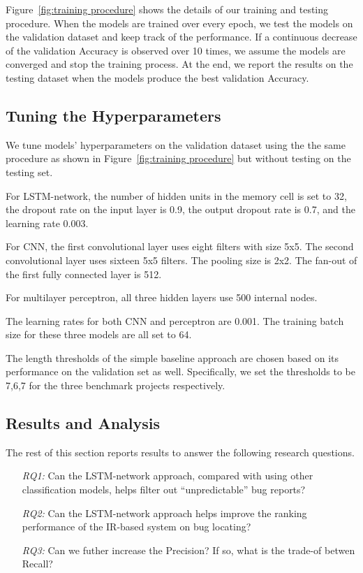 Figure~\ref{fig:training procedure} shows the details of our training and testing procedure. When the models are trained over every epoch, we test the models on the validation dataset and keep track of the performance. If a continuous decrease of the validation Accuracy is observed over 10 times, we assume the models are converged and stop the training process. At the end, we report the results on the testing dataset when the models produce the best validation Accuracy.

\subsection{Tuning the Hyperparameters}
\label{sec:tuning parameters}
We tune models' hyperparameters on the validation dataset using the the same procedure as shown in Figure~\ref{fig:training procedure} but without testing on the testing set.

For LSTM-network, the number of hidden units in the memory cell is set to 32, the dropout rate on the input layer is 0.9, the output dropout rate is 0.7, and the learning rate 0.003.

For CNN, the first convolutional layer uses eight filters with size 5x5. The second convolutional layer uses sixteen 5x5 filters. The pooling size is 2x2. The fan-out of the first fully connected layer is 512.

For multilayer perceptron, all three hidden layers use 500 internal nodes.

The learning rates for both CNN and perceptron are 0.001. The training batch size for these three models are all set to 64.

The length thresholds of the simple baseline approach are chosen based on its performance on the validation set as well. Specifically, we set the thresholds to be 7,6,7 for the three benchmark projects respectively.

\subsection{Results and Analysis}
\label{sec:results and analysis}
The rest of this section reports results to answer the following research questions.
\begin{enumerate}
  \item[\textit{RQ1:}] Can the LSTM-network approach, compared with using other classification models, helps filter out ``unpredictable'' bug reports?
  \item[\textit{RQ2:}] Can the LSTM-network approach helps improve the ranking performance of the IR-based system on bug locating?
  \item[\textit{RQ3:}] Can we futher increase the Precision? If so, what is the trade-of betwen Recall?
\end{enumerate}

